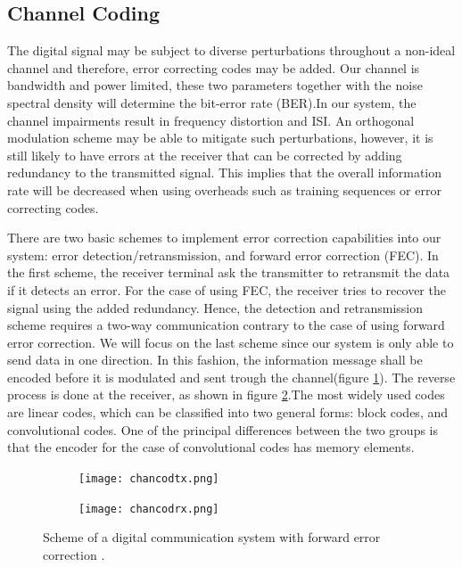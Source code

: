 \documentclass[12pt,a4paper,openright]{article}
\begin{document}
\subsection{Channel Coding}

The digital signal may be subject to diverse perturbations throughout a non-ideal channel and therefore, error correcting codes may be added. Our channel is bandwidth and power limited, these two parameters together with the noise spectral density will determine the bit-error rate (BER)\cite{HaykinBook}.In our system, the channel impairments result in frequency distortion and ISI. An orthogonal  modulation scheme may be able to mitigate such perturbations, however, it is still likely to have errors at the receiver that can be corrected by adding redundancy to the transmitted signal. This implies that the overall information rate will be decreased when using overheads such as training sequences or error correcting codes.
 
 There are two basic schemes to implement error correction capabilities into our system: error detection/retransmission, and forward error correction (FEC)\cite{SklarBook}. In the first scheme, the receiver terminal ask the transmitter to retransmit the data if it detects an error. For the case of using FEC, the receiver tries to recover the signal using the added redundancy. Hence, the detection and retransmission scheme requires a two-way communication contrary to the case of using forward error correction. We will focus on the last scheme since our system is only able to send data in one direction. In this fashion, the information message shall be encoded before it is modulated and sent trough the channel(figure \ref{fig:ChanCodTX}). The reverse process is done at the receiver, as shown in figure \ref{fig:ChanCodRX}.The most widely used codes are linear codes, which can be classified into two general forms: block codes, and convolutional codes. One of the principal differences between the two groups is that the encoder for the case of convolutional codes has memory elements.
 
  \begin{figure}[h]
  \centering
 	\begin{subfigure}[h]{0.9\textwidth}
  \centering
     \texttt{[image: chancodtx.png]}
     \label{fig:ChanCodTX}
 
 	\end{subfigure}
 	\quad
 
 	\begin{subfigure}[h]{0.9\textwidth}
  	\centering
     \texttt{[image: chancodrx.png]}
     \label{fig:ChanCodRX}
  	\end{subfigure}
     \caption{Scheme of a digital communication system with forward error correction \protect\cite{HaykinBook}.}
     \label{fig:ChanCoding}
 \end{figure}
 
\end{document}
